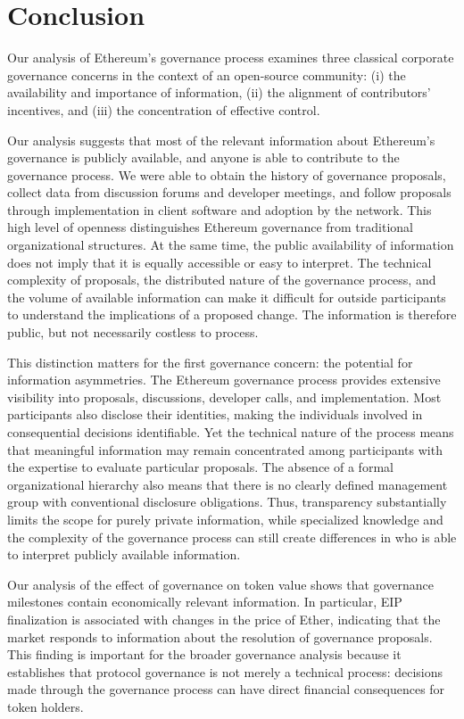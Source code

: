\documentclass[No]{AEA}
\begin{document}
\section{Conclusion}

Our analysis of Ethereum's governance process examines three classical corporate governance concerns in the context of an open-source community: (i) the availability and importance of information, (ii) the alignment of contributors' incentives, and (iii) the concentration of effective control.

Our analysis suggests that most of the relevant information about Ethereum's governance is publicly available, and anyone is able to contribute to the governance process. We were able to obtain the history of governance proposals, collect data from discussion forums and developer meetings, and follow proposals through implementation in client software and adoption by the network. This high level of openness distinguishes Ethereum governance from traditional organizational structures. At the same time, the public availability of information does not imply that it is equally accessible or easy to interpret. The technical complexity of proposals, the distributed nature of the governance process, and the volume of available information can make it difficult for outside participants to understand the implications of a proposed change. The information is therefore public, but not necessarily costless to process.

This distinction matters for the first governance concern: the potential for information asymmetries. The Ethereum governance process provides extensive visibility into proposals, discussions, developer calls, and implementation. Most participants also disclose their identities, making the individuals involved in consequential decisions identifiable. Yet the technical nature of the process means that meaningful information may remain concentrated among participants with the expertise to evaluate particular proposals. The absence of a formal organizational hierarchy also means that there is no clearly defined management group with conventional disclosure obligations. Thus, transparency substantially limits the scope for purely private information, while specialized knowledge and the complexity of the governance process can still create differences in who is able to interpret publicly available information.

Our analysis of the effect of governance on token value shows that governance milestones contain economically relevant information. In particular, EIP finalization is associated with changes in the price of Ether, indicating that the market responds to information about the resolution of governance proposals. This finding is important for the broader governance analysis because it establishes that protocol governance is not merely a technical process: decisions made through the governance process can have direct financial consequences for token holders.
\end{document}
